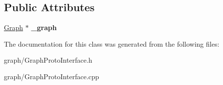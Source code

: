 \subsection*{Public Attributes}
\begin{DoxyCompactItemize}
\item 
\hypertarget{class_graph_proto_interface_a8e262de0a3f65eaa20e5c528363bbb2a}{
\hyperlink{class_scarab_1_1_graph_1_1_graph}{Graph} $\ast$ {\bfseries \_\-graph}}
\label{class_graph_proto_interface_a8e262de0a3f65eaa20e5c528363bbb2a}

\end{DoxyCompactItemize}


The documentation for this class was generated from the following files:\begin{DoxyCompactItemize}
\item 
graph/GraphProtoInterface.h\item 
graph/GraphProtoInterface.cpp\end{DoxyCompactItemize}
